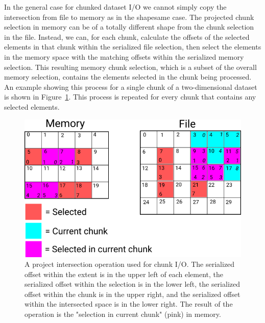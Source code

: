 \begin{itemize}
In the general case for chunked dataset I/O we cannot simply copy the intersection from file to memory as in the shapesame case. The projected chunk selection in memory can be of a totally different shape from the chunk selection in the file. Instead, we can, for each chunk, calculate the offsets of the selected elements in that chunk within the serialized file selection, then select the elements in the memory space with the matching offsets within the serialized memory selection. This resulting memory chunk selection, which is a subset of the overall memory selection, contains the elements selected in the chunk being processed. An example showing this process for a single chunk of a two-dimensional dataset is shown in Figure~\ref{fig:project-intersection-chunk}. This process is repeated for every chunk that contains any selected elements.

\begin{figure}[h]
\centering
\includegraphics[scale=0.8]{images/Project_intersection_chunk.png}
\caption{A project intersection operation used for chunk I/O. The serialized offset within the extent is in the upper left of each element, the serialized offset within the selection is in the lower left, the serialized offset within the chunk is in the upper right, and the serialized offset within the intersected space is in the lower right. The result of the operation is the "selection in current chunk" (pink) in memory.}
\label{fig:project-intersection-chunk}
\end{figure}


\end{itemize}
